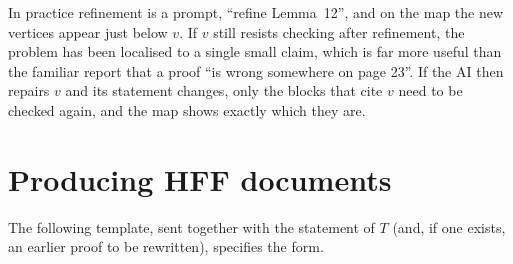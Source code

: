 \documentclass[11pt]{article}
\theoremstyle{plain}
\theoremstyle{definition}
\theoremstyle{remark}
\theoremstyle{definition}
\theoremstyle{plain}
\theoremstyle{remark}
\begin{document}
In practice refinement is a prompt, ``refine Lemma~12'', and on the map the new vertices appear just below $v$. If $v$ still resists checking after refinement, the problem has been localised to a single small claim, which is far more useful than the familiar report that a proof ``is wrong somewhere on page 23''. If the AI then repairs $v$ and its statement changes, only the blocks that cite $v$ need to be checked again, and the map shows exactly which they are.

\section{Producing HFF documents}\label{sec:produce}

The following template, sent together with the statement of $T$ (and, if one exists, an earlier proof to be rewritten), specifies the form.
\end{document}
